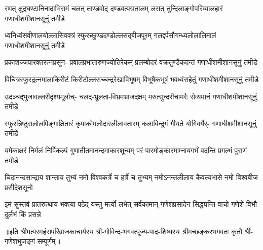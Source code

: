 

\fourlineindentedshloka
{रणत् क्षुद्रघण्टानिनादाभिरामं}
{चलत् ताण्डवोद् दण्डवत्पद्मतालम्}
{लसत् तुन्दिलाङ्गोपरिव्यालहारं}
{गणाधीशमीशानसूनुं तमीडे}%

\fourlineindentedshloka
{ध्वनिध्वंसवीणालयोल्लासिवक्त्रं}
{स्फुरच्छुण्डदण्डोल्लसद्‌बीजपूरम्}
{गलद्दर्पसौगन्ध्यलोलालिमालं}
{गणाधीशमीशानसूनुं तमीडे}%

\fourlineindentedshloka
{प्रकाशज्जपारक्तरत्नप्रसून-}
{प्रवालप्रभातारुणज्योतिरेकम्}
{प्रलम्बोदरं वक्रतुण्डैकदन्तं}
{गणाधीशमीशानसूनुं तमीडे}%

\fourlineindentedshloka
{विचित्रस्फुरद्रत्नमालाकिरीटं}
{किरीटोल्लसच्चन्द्ररेखाविभूषम्}
{विभूषैकभूषं भवध्वंसहेतुं}
{गणाधीशमीशानसूनुं तमीडे}%

\fourlineindentedshloka
{उदञ्चद्भुजावल्लरीदृश्यमूलोच्-}
{चलद्‌-भ्रूलता-विभ्रमभ्राजदक्षम्}
{मरुत्सुन्दरीचामरैः सेव्यमानं}
{गणाधीशमीशानसूनुं तमीडे}%

\fourlineindentedshloka
{स्फुरन्निष्ठुरालोलपिङ्गाक्षितारं}
{कृपाकोमलोदारलीलावतारम्}
{कलाबिन्दुगं गीयते योगिवर्यैर्-}
{गणाधीशमीशानसूनुं तमीडे}%

\fourlineindentedshloka
{यमेकाक्षरं निर्मलं निर्विकल्पं}
{गुणातीतमानन्दमाकारशून्यम्}
{परं पारमोङ्कारमाम्नायगर्भं}
{वदन्ति प्रगल्भं पुराणं तमीडे}%

\fourlineindentedshloka
{चिदानन्दसान्द्राय शान्ताय तुभ्यं}
{नमो विश्वकर्त्रे च हर्त्रे च तुभ्यम्}
{नमोऽनन्तलीलाय कैवल्यभासे}
{नमो विश्वबीज प्रसीदेशसूनो}%

\fourlineindentedshloka
{इमं सुस्तवं प्रातरुत्थाय भक्त्या}
{पठेद् यस्तु मर्त्यो लभेत् सर्वकामान्}
{गणेशप्रसादेन सिद्ध्यन्ति वाचो}
{गणेशे विभौ दुर्लभं किं प्रसन्ने}%

॥इति श्रीमत्परमहंसपरिव्राजकाचार्यस्य श्री-गोविन्द-भगवत्पूज्य-पाद-शिष्यस्य
श्रीमच्छङ्करभगवतः कृतौ श्री-गणेशभुजङ्गं सम्पूर्णम्॥

